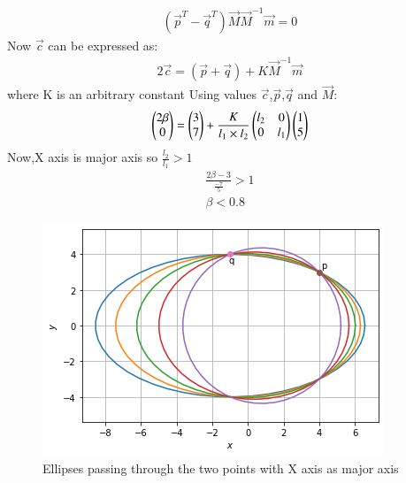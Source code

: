 \documentclass[journal,12pt,twocolumn]{IEEEtran}
\begin{document}
\begin{align}
    (\vec{p}^T-\vec{q}^T)\vec{M}\vec{M}^{-1}\vec{m}=0
\end{align}
Now $\vec{c}$ can be expressed as:
\begin{align}
2\vec{c}=(\vec{p}+\vec{q})+K\vec{M}^{-1}\vec{m}
\end{align}
where K is an arbitrary constant
Using values $\vec{c}$,$\vec{p}$,$\vec{q}$ and $\vec{M}$:
\begin{align}
 \begin{pmatrix}2\beta\\0\end{pmatrix}=\begin{pmatrix}3\\7\end{pmatrix}+\frac{K}{l_1\times l_2}\begin{pmatrix}l_2 & 0 \\ 0 & l_1\end{pmatrix}\begin{pmatrix}1\\5\end{pmatrix}
\end{align}
Now,X axis is major axis so 
$\frac{l_2}{l_1}>1$
\begin{align}
    \frac{2\beta-3}{\frac{-7}{5}}>1\\
    \beta<0.8
\end{align}

\begin{figure}[!ht]
\centering
\includegraphics[width=\columnwidth]{figure5_1}
\caption{Ellipses passing through the two points with X axis as major axis}
\label{fig:ellipses}	
\end{figure}
\end{document}

